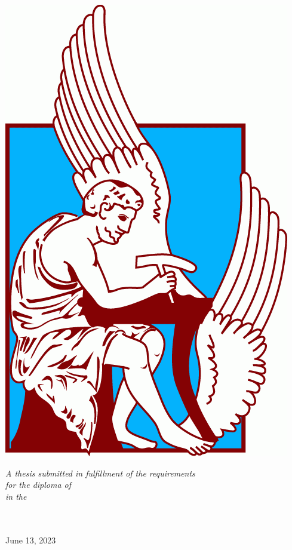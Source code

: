 \documentclass[
	12pt, %
	english,
	onehalfspacing, %
	liststotoc, %
	toctotoc, %
	parskip, %
	headsepline, %
]{MastersDoctoralThesis} %
\begin{document}
\begin{titlepage}
\begin{center}
		\includegraphics[scale=0.2]{Images/logos/TUC.png} %
		\\
		
		\vfill

		\large \textit{A thesis submitted in fulfillment of the requirements\\ for the diploma of \degreename}\\[0.25cm] %
		\textit{in the}\\[0.25cm]
		\deptname\\\groupname\\[0.2cm] %

		\vfill

		{\large June 13, 2023}\\ %
		\vfill
	\end{center}
\end{titlepage}
\end{document}
